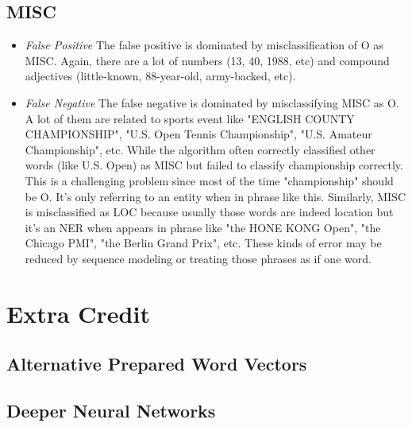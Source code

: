 \documentclass[11pt, oneside]{article}   	%
\begin{document}
\subsection{MISC}

\begin{itemize}
\item \emph{False Positive}
The false positive is dominated by misclassification of O as MISC. Again, there are a lot of numbers (13, 40, 1988, etc)  and compound adjectives (little-known, 88-year-old, army-backed, etc). 

\item \emph{False Negative} 
The false negative is dominated by misclassifying MISC as O. A lot of them are related to sports event like "ENGLISH COUNTY CHAMPIONSHIP", "U.S. Open Tennis Championship",  "U.S. Amateur Championship", etc.  While the algorithm often correctly classified other words (like U.S. Open) as MISC but failed to classify championship correctly. This is a challenging problem since most of the time "championship" should be O. It's only referring to an entity when in phrase like this. Similarly, MISC is misclassified as LOC because usually those words are indeed location but it's an NER when appears in phrase like "the HONE KONG Open", "the Chicago PMI", "the Berlin Grand Prix", etc. These kinds of error may be reduced by sequence modeling or treating those phrases as if one word. 

\end{itemize}




\section{Extra Credit}
\subsection{Alternative Prepared Word Vectors}
\subsection{Deeper Neural Networks}
\end{document}
